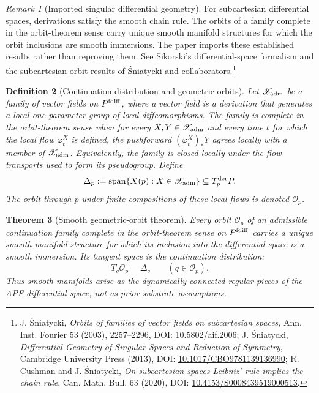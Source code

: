 \documentclass[11pt]{article}
\newtheorem{theorem}{Theorem}[section]
\newtheorem{definition}[theorem]{Definition}
\theoremstyle{remark}
\newtheorem{remark}[theorem]{Remark}
\begin{document}
\begin{remark}[Imported singular differential geometry]
For subcartesian differential spaces, derivations satisfy the smooth chain
rule.  The orbits of a family complete in the orbit-theorem sense carry unique
smooth manifold structures for which the orbit inclusions are smooth
immersions.  The paper imports these established results rather than
reproving them.  See Sikorski's differential-space formalism and the subcartesian orbit results of Śniatycki and collaborators.\footnote{J. Śniatycki, \emph{Orbits of families of vector fields on subcartesian spaces}, Ann. Inst. Fourier 53 (2003), 2257--2296, DOI: \href{https://doi.org/10.5802/aif.2006}{10.5802/aif.2006}; J. Śniatycki, \emph{Differential Geometry of Singular Spaces and Reduction of Symmetry}, Cambridge University Press (2013), DOI: \href{https://doi.org/10.1017/CBO9781139136990}{10.1017/CBO9781139136990}; R. Cushman and J. Śniatycki, \emph{On subcartesian spaces Leibniz' rule implies the chain rule}, Can. Math. Bull. 63 (2020), DOI: \href{https://doi.org/10.4153/S0008439519000513}{10.4153/S0008439519000513}.}
\end{remark}

\begin{definition}[Continuation distribution and geometric orbits]
\label{def:continuation-distribution}
Let $\mathscr X_{\rm adm}$ be a family of vector fields on
$P^{\rm fdiff}$, where a vector field is a derivation that generates a local
one-parameter group of local diffeomorphisms.  The family is
\emph{complete in the orbit-theorem sense} when for every
$X,Y\in\mathscr X_{\rm adm}$ and every time $t$ for which the local flow
$\varphi_t^X$ is defined, the pushforward
$(\varphi_t^X)_*Y$ agrees locally with a member of
$\mathscr X_{\rm adm}$.  Equivalently, the family is closed locally under the
flow transports used to form its pseudogroup.  Define
\[
        \Delta_p:=\operatorname{span}\{X(p):X\in\mathscr X_{\rm adm}\}
        \subseteq T_p^{\rm der}P.
\]
The orbit through $p$ under finite compositions of these local flows is denoted
$\mathcal O_p$.
\end{definition}

\begin{theorem}[Smooth geometric-orbit theorem]
\label{thm:smooth-geometric-orbit}
Every orbit $\mathcal O_p$ of an admissible continuation family complete in the orbit-theorem sense on $P^{\rm fdiff}$ carries a unique smooth manifold structure for which its inclusion into the differential space is a smooth immersion.  Its tangent space is the continuation distribution:
\[
        T_q\mathcal O_p=\Delta_q
        \qquad(q\in\mathcal O_p).
\]
Thus smooth manifolds arise as the dynamically connected regular pieces of the
APF differential space, not as prior substrate assumptions.
\end{theorem}
\end{document}
